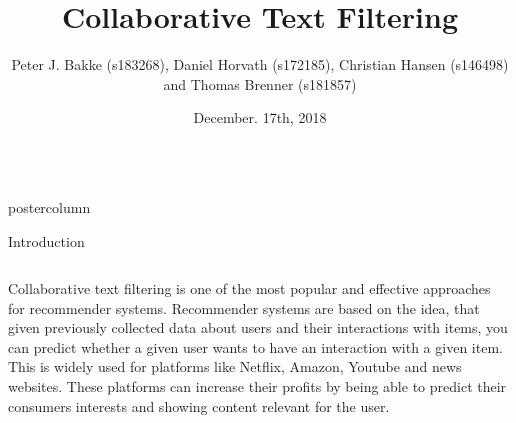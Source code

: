 \documentclass[final,hyperref={pdfpagelabels=false}]{beamer}
\title{
\huge Collaborative Text Filtering}
\author{Peter J. Bakke (s183268), Daniel Horvath (s172185), Christian Hansen (s146498) and Thomas Brenner (s181857)}
\institute[Department]{\small DTU Compute, Technical University of Denmark}
\date[December. 17th, 2018]{December. 17th, 2018}
\newlength{\columnheight}
\begin{document}
\begin{frame}
 \begin{columns}
 \begin{column}{.49\paperwidth}
 \begin{beamercolorbox}[center,wd=\textwidth]{postercolumn}
 \begin{minipage}[T]{.99\textwidth}  %
 \parbox[t][\columnheight]{\textwidth}{ %

\begin{block}{Introduction}
 \begin{columns}
 \begin{column}{1\textwidth}


%
%
\centering
\begin{minipage}[t]{0.98\textwidth}

\footnotesize{Collaborative text filtering is one of the most popular and effective approaches for recommender systems. Recommender systems are based on the idea, that given previously collected data about users and their interactions with items, you can predict whether a given user wants to have an interaction with a given item. This is widely used for platforms like Netflix, Amazon, Youtube and news websites. These platforms can increase their profits by being able to predict their consumers interests and showing content relevant for the user. 

}
\end{minipage}
\end{column}
\end{columns}
\end{block}}
\end{minipage}
\end{beamercolorbox}
\end{column}
\end{columns}
\end{frame}
\end{document}

